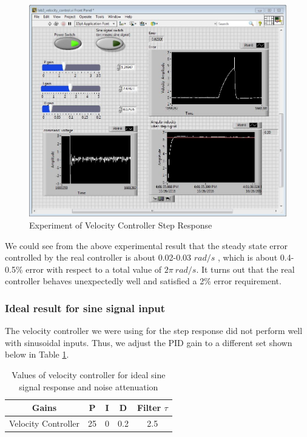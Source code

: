 \documentclass[letterpaper]{article}
\begin{document}
\begin{figure}[H]
\begin{center}
\includegraphics[width = 15cm]{velocity_control_step.JPG}
\caption{Experiment of Velocity Controller Step Response}
\label{velocity_control_step}
\end{center}
\end{figure}

We could see from the above experimental result that the steady state error controlled by the real controller is about 0.02-0.03 $rad/s$ , which is about 0.4-0.5\% error with respect to a total value of $2\pi \ rad/s$. It turns out that the real controller behaves unexpectedly well and satisfied a 2\% error requirement.\\
\subsubsection*{Ideal result for sine signal input}
The velocity controller we were using for the step response did not perform well with sinusoidal inputs. Thus, we adjust the PID gain to a different set shown below in Table \ref{velocityGains_sine}.\\
\begin{table}[htb]
\begin{center}
    \begin{tabular}{|c|c|c|c|c|}
    \hline
        Gains & P   & I & D     & Filter $\tau$   \\ \hline
        Velocity Controller  & 25 & 0 & 0.2 & 2.5  \\
    \hline
    \end{tabular}
\end{center}
\caption{Values of velocity controller for ideal sine signal response and noise attenuation}
\label{velocityGains_sine}
\end{table}
\\
\end{document}
